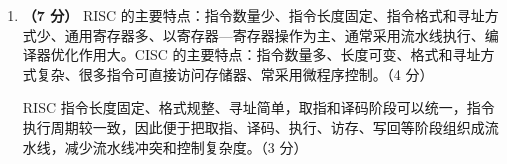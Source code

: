 \documentclass[a4paper,11pt]{article}
\begin{document}
\begin{enumerate}[start=1, label=\textbf{\arabic*.}, leftmargin=2.4em, itemsep=0.45em]
\item \textbf{（7 分）}
RISC 的主要特点：指令数量少、指令长度固定、指令格式和寻址方式少、通用寄存器多、以寄存器—寄存器操作为主、通常采用流水线执行、编译器优化作用大。CISC 的主要特点：指令数量多、长度可变、格式和寻址方式复杂、很多指令可直接访问存储器、常采用微程序控制。\hfill（4 分）

RISC 指令长度固定、格式规整、寻址简单，取指和译码阶段可以统一，指令执行周期较一致，因此便于把取指、译码、执行、访存、写回等阶段组织成流水线，减少流水线冲突和控制复杂度。\hfill（3 分）

\end{enumerate}

\end{document}

